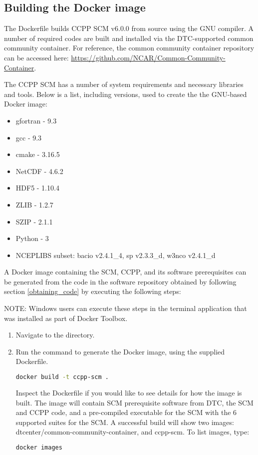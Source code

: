 \subsection{Building the Docker image}

The Dockerfile builds CCPP SCM v6.0.0 from source using the GNU compiler. A number of required codes are built and installed via the DTC-supported common community container. For reference, the common community container repository can be accessed here: \url{https://github.com/NCAR/Common-Community-Container}.

The CCPP SCM has a number of system requirements and necessary libraries and tools. Below is a list, including versions, used to create the the GNU-based Docker image:
\begin{itemize}
\item gfortran - 9.3
\item gcc - 9.3
\item cmake - 3.16.5
\item NetCDF - 4.6.2
\item HDF5 - 1.10.4
\item ZLIB - 1.2.7
\item SZIP - 2.1.1
\item Python - 3
\item NCEPLIBS subset: bacio v2.4.1\_4, sp v2.3.3\_d, w3nco v2.4.1\_d
\end{itemize}

A Docker image containing the SCM, CCPP, and its software prerequisites can be generated from the code in the software repository obtained by following section \ref{obtaining_code} by executing the following steps:

NOTE: Windows users can execute these steps in the terminal application that was installed as part of Docker Toolbox.

\begin{enumerate}
\item Navigate to the  directory.
\item Run the  command to generate the Docker image, using the supplied Dockerfile.
\begin{lstlisting}[language=bash]
docker build -t ccpp-scm .
\end{lstlisting}
Inspect the Dockerfile if you would like to see details for how the image is built. The image will contain SCM prerequisite software from DTC, the SCM and CCPP code, and a pre-compiled executable for the SCM with the 6 supported suites for the SCM. A successful build will show two images: dtcenter/common-community-container, and ccpp-scm. To list images, type:
\begin{lstlisting}[language=bash]
docker images
\end{lstlisting}
\end{enumerate}

